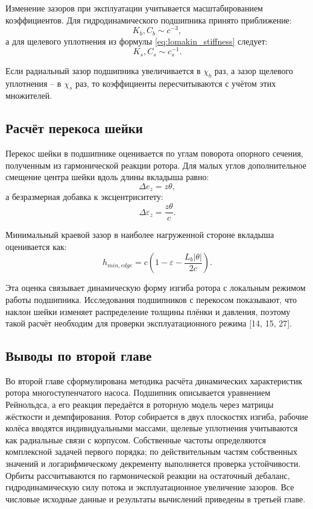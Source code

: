 Изменение зазоров при эксплуатации учитывается масштабированием коэффициентов. Для гидродинамического подшипника принято приближение:
\begin{equation}
    K_b,C_b\sim c^{-3},
\end{equation}
а для щелевого уплотнения из формулы \eqref{eq:lomakin_stiffness} следует:
\begin{equation}
    K_s,C_s\sim c_s^{-1}.
\end{equation}

Если радиальный зазор подшипника увеличивается в $\chi_b$ раз, а зазор щелевого уплотнения -- в $\chi_s$ раз, то коэффициенты пересчитываются с учётом этих множителей.

\subsection{Расчёт перекоса шейки}

Перекос шейки в подшипнике оценивается по углам поворота опорного сечения, полученным из гармонической реакции ротора. Для малых углов дополнительное смещение центра шейки вдоль длины вкладыша равно:
\begin{equation}
    \Delta e_z=z\theta,
\end{equation}
а безразмерная добавка к эксцентриситету:
\begin{equation}
    \Delta\varepsilon_z=\frac{z\theta}{c}.
\end{equation}

Минимальный краевой зазор в наиболее нагруженной стороне вкладыша оценивается как:
\begin{equation}
    h_{min,edge}=c\left(1-\varepsilon-\frac{L_b|\theta|}{2c}\right).
    \label{eq:edge_clearance}
\end{equation}

Эта оценка связывает динамическую форму изгиба ротора с локальным режимом работы подшипника. Исследования подшипников с перекосом показывают, что наклон шейки изменяет распределение толщины плёнки и давления, поэтому такой расчёт необходим для проверки эксплуатационного режима [14, 15, 27].

\subsection{Выводы по второй главе}

Во второй главе сформулирована методика расчёта динамических характеристик ротора многоступенчатого насоса. Подшипник описывается уравнением Рейнольдса, а его реакция передаётся в роторную модель через матрицы жёсткости и демпфирования. Ротор собирается в двух плоскостях изгиба, рабочие колёса вводятся индивидуальными массами, щелевые уплотнения учитываются как радиальные связи с корпусом. Собственные частоты определяются комплексной задачей первого порядка; по действительным частям собственных значений и логарифмическому декременту выполняется проверка устойчивости. Орбиты рассчитываются по гармонической реакции на остаточный дебаланс, гидродинамическую силу потока и эксплуатационное увеличение зазоров. Все числовые исходные данные и результаты вычислений приведены в третьей главе.

